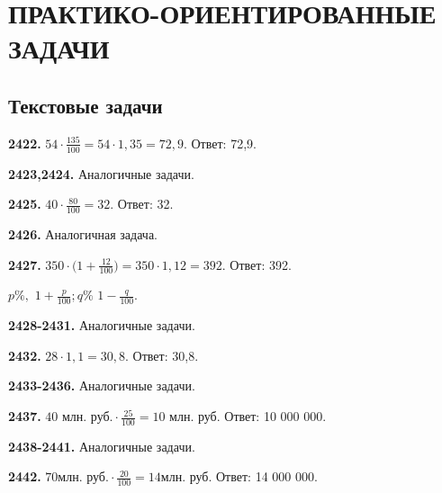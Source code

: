 \chapter{ПРАКТИКО-ОРИЕНТИРОВАННЫЕ ЗАДАЧИ}
\section{Текстовые задачи}


\textbf{2422.} $54 \cdot \frac{135}{100} = 54 \cdot 1,35 = 72,9$. \newline \null \hspace*{\fill} Ответ: 72,9.

\textbf{2423,2424.} Аналогичные задачи.

\textbf{2425.} $40 \cdot \frac{80}{100} = 32.$ \newline \null \hspace*{\fill} Ответ: 32.

\textbf{2426.} Аналогичная задача.

\textbf{2427.} $350 \cdot \big( 1+\frac{12}{100}\big) = 350 \cdot 1,12 = 392$. \newline \null \hspace*{\fill} Ответ: 392. 

 $p\%,$\newline{} $1 + \frac{p}{100};$$q\%$  $1 - \frac{q}{100}.$

\textbf{2428-2431.} Аналогичные задачи.

\textbf{2432.} $28 \cdot 1,1 = 30,8.$ \newline \null \hspace*{\fill} Ответ: 30,8. 

\textbf{2433-2436.} Аналогичные задачи.

\textbf{2437.} $\text{40 млн. руб.} \cdot \frac{25}{100} = \text{10 млн. руб.}$ \newline \null \hspace*{\fill} Ответ: 10 000 000. 

\textbf{2438-2441.} Аналогичные задачи.

\textbf{2442.}  \newline $70 \text{млн. руб.}\cdot \frac{20}{100} = 14 \text{млн. руб.} $ \newline \null \hspace*{\fill} Ответ: 14 000 000. 

